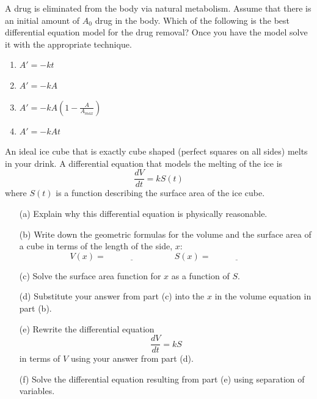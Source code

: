 \begin{problem}
    A drug is eliminated from the body via natural metabolism.  Assume that there is an
    initial amount of $A_0$ drug in the body.  Which of the following is the best
    differential equation model for the drug removal?  Once you have the model solve it
    with the appropriate technique.
    \begin{enumerate}
        \item $A' = -kt$
        \item $A' = -kA$
        \item $A' = -kA\left( 1-\frac{A}{A_{max}} \right)$
        \item $A' = -kAt$
    \end{enumerate}
\end{problem}

\begin{problem}
    An ideal ice cube that is exactly cube shaped (perfect squares on all sides) melts in
    your drink.  A differential equation that models the melting of the ice is 
    \[ \frac{dV}{dt} = k S(t) \]
    where $S(t)$ is a function describing the surface area of the ice cube.  
    \begin{enumerate}
        \item[(a)] Explain why this differential equation is physically reasonable.
        \item[(b)] Write down the geometric formulas for the volume and the surface area
            of a cube in terms of the length of the side, $x$:
            \[ V(x) = \underline{\hspace{1in}} \qquad S(x) = \underline{\hspace{1in}} \]
        \item[(c)] Solve the surface area function for $x$ as a function of $S$.
        \item[(d)] Substitute your answer from part (c) into the $x$ in the volume
            equation in part (b). 
        \item[(e)] Rewrite the differential equation 
            \[ \frac{dV}{dt} = kS \]
            in terms of $V$ using your answer from part (d).
        \item[(f)] Solve the differential equation resulting from part (e) using
            separation of variables.
    \end{enumerate}
\end{problem}


